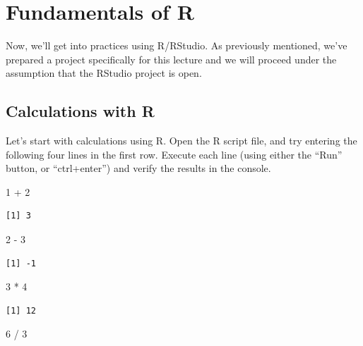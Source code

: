 \documentclass[
  a4paper,
]{book}
\newenvironment{Shaded}{\begin{snugshade}}{\end{snugshade}}
\newcommand{\DecValTok}[1]{\textcolor[rgb]{0.68,0.00,0.00}{#1}}
\newcommand{\SpecialCharTok}[1]{\textcolor[rgb]{0.37,0.37,0.37}{#1}}
\begin{document}

\chapter{Fundamentals of R}\label{sec-Rbase}

Now, we'll get into practices using R/RStudio. As previously mentioned,
we've prepared a project specifically for this lecture and we will
proceed under the assumption that the RStudio project is open.

\section{Calculations with R}\label{calculations-with-r}

Let's start with calculations using R. Open the R script file, and try
entering the following four lines in the first row. Execute each line
(using either the ``Run'' button, or ``ctrl+enter'') and verify the
results in the console.

\begin{Shaded}
\begin{Highlighting}[]
\DecValTok{1} \SpecialCharTok{+} \DecValTok{2}
\end{Highlighting}
\end{Shaded}

\begin{verbatim}
[1] 3
\end{verbatim}

\begin{Shaded}
\begin{Highlighting}[]
\DecValTok{2} \SpecialCharTok{{-}} \DecValTok{3}
\end{Highlighting}
\end{Shaded}

\begin{verbatim}
[1] -1
\end{verbatim}

\begin{Shaded}
\begin{Highlighting}[]
\DecValTok{3} \SpecialCharTok{*} \DecValTok{4}
\end{Highlighting}
\end{Shaded}

\begin{verbatim}
[1] 12
\end{verbatim}

\begin{Shaded}
\begin{Highlighting}[]
\DecValTok{6} \SpecialCharTok{/} \DecValTok{3}
\end{Highlighting}
\end{Shaded}
\end{document}
